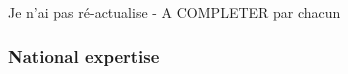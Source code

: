 \ \\
Je n'ai pas r{\'e}-actualise - A COMPLETER par chacun 
\ \\

%
%
%
%
%
%
\subsubsection*{National expertise}

